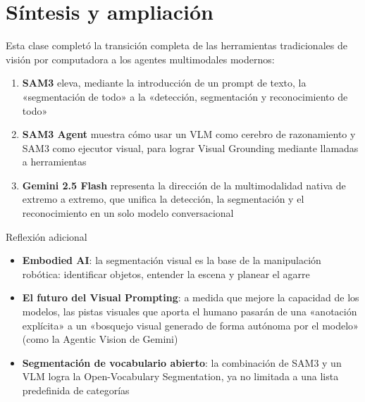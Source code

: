 \section{Síntesis y ampliación}

Esta clase completó la transición completa de las herramientas tradicionales de visión por computadora a los agentes multimodales modernos:

\begin{enumerate}
    \item \textbf{SAM3} eleva, mediante la introducción de un prompt de texto, la «segmentación de todo» a la «detección, segmentación y reconocimiento de todo»
    \item \textbf{SAM3 Agent} muestra cómo usar un VLM como cerebro de razonamiento y SAM3 como ejecutor visual, para lograr Visual Grounding mediante llamadas a herramientas
    \item \textbf{Gemini 2.5 Flash} representa la dirección de la multimodalidad nativa de extremo a extremo, que unifica la detección, la segmentación y el reconocimiento en un solo modelo conversacional
\end{enumerate}

\begin{knowledgebox}{Reflexión adicional}
\begin{itemize}
    \item \textbf{Embodied AI}: la segmentación visual es la base de la manipulación robótica: identificar objetos, entender la escena y planear el agarre
    \item \textbf{El futuro del Visual Prompting}: a medida que mejore la capacidad de los modelos, las pistas visuales que aporta el humano pasarán de una «anotación explícita» a un «bosquejo visual generado de forma autónoma por el modelo» (como la Agentic Vision de Gemini)
    \item \textbf{Segmentación de vocabulario abierto}: la combinación de SAM3 y un VLM logra la Open-Vocabulary Segmentation, ya no limitada a una lista predefinida de categorías
\end{itemize}
\end{knowledgebox}



